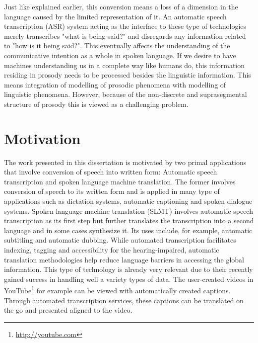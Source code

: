 Just like explained earlier, this conversion means a loss of a dimension in the language caused by the limited representation of it. An automatic speech transcription (ASR) system acting as the interface to these type of technologies merely transcribes "what is being said?" and disregards any information related to "how is it being said?". This eventually affects the understanding of the communicative intention as a whole in spoken language. If we desire to have machines understanding us in a complete way like humans do, this information residing in prosody needs to be processed besides the linguistic information.
This means integration of modelling of prosodic phenomena with modelling of linguistic phenomena. However, because of the non-discrete and suprasegmental structure of prosody this is viewed as a challenging problem. 





\section{Motivation}

The work presented in this dissertation is motivated by two primal applications that involve conversion of speech into written form: Automatic speech transcription and spoken language machine translation. The former involves conversion of speech to its written form and is applied in many type of applications such as dictation systems, automatic captioning and spoken dialogue systems. Spoken language machine translation (SLMT) involves automatic speech transcription as its first step but further translates the transcription into a second language and in some cases synthesize it. Its uses include, for example, automatic subtitling and automatic dubbing. While automated transcription facilitates indexing, tagging and accessibility for the hearing-impaired, automatic translation methodologies help reduce language barriers in accessing the global information. This type of technology is already very relevant due to their recently gained success in handling well a variety types of data. The user-created videos in YouTube\footnote{\url{http://youtube.com}} for example can be viewed with automatically created captions. Through automated transcription services, these captions can be translated on the go and presented aligned to the video. 

